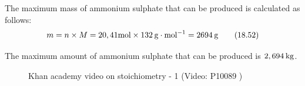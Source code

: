 {\begin{mdframed}[linewidth=4, leftmargin=40, rightmargin=40]
\begin{exercise}
\begin{enumerate}[noitemsep, label=\textbf{Step} \textbf{\arabic*}. ]
      \label{m38712*id285290}The maximum mass of ammonium sulphate that can be produced is calculated as follows:
      \label{m38712*id285296}\nopagebreak\noindent{}
    \begin{equation}
    m=n\ensuremath{\times}M=20,41\mathrm{mol}\ensuremath{\times}132\phantom{\rule{2pt}{0ex}}\mathrm{g}\ensuremath{\cdot}{\mathrm{mol}}^{-1}=2694\phantom{\rule{2pt}{0ex}}\mathrm{g}\tag{18.52}
      \end{equation}
      \par 
      \label{m38712*id285362}The maximum amount of ammonium sulphate that can be produced is $2,694\phantom{\rule{2pt}{0ex}}\mathrm{kg}$.
 \par 
      \end{enumerate}
    \end{exercise}
    \end{mdframed}
    }
    \noindent
\label{m38712*eip-546}
    \setcounter{subfigure}{0}
	\begin{figure}[H] %
    \textnormal{Khan academy video on stoichiometry - 1}\vspace{.1in} \nopagebreak
  \label{m38712*yt-media4}\label{m38712*yt-video4}
             { (Video:  P10089 )}
      \vspace{2pt}
    \vspace{.1in}
 \end{figure}       \par \label{m38712*secfhsst!!!underscore!!!id2276}
